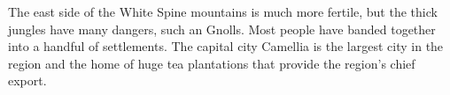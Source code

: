 The east side of the White Spine mountains is much more fertile, but the thick jungles have many dangers, such an Gnolls.
Most people have banded together into a handful of settlements.
The capital city Camellia is the largest city in the region and the home of huge tea plantations that provide the region's chief export.
